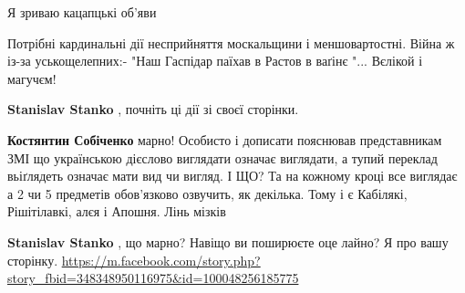 \begin{itemize}
 
Я зриваю кацапцькі об'яви

 

Потрібні кардинальні дії несприйняття москальщини і меншовартостні. Війна ж
із-за уськощелепних:- "Наш Гаспідар паїхав в Растов в ваґінє "... Вєлікой і
магучєм!

\begin{itemize}
 
\textbf{Stanislav Stanko} , почніть ці дії зі своєї сторінки.

\begin{itemize}
 
\textbf{Костянтин Собіченко} марно! Особисто і дописати пояснював представникам
ЗМІ що українською дієслово виглядати означає виглядати, а тупий переклад
вьіґлядеть означає мати вид чи вигляд. І ЩО? Та на кожному кроці все виглядає а
2 чи 5 предметів обов'язково озвучить, як декілька. Тому і є Кабілякі,
Рішітілавкі, алєя і Апошня. Лінь мізків

 
\textbf{Stanislav Stanko} , що марно? Навіщо ви поширюєте оце лайно? Я про вашу сторінку.
\url{https://m.facebook.com/story.php?story_fbid=348348950116975&id=100048256185775}
\end{itemize}

\end{itemize}

\end{itemize}

